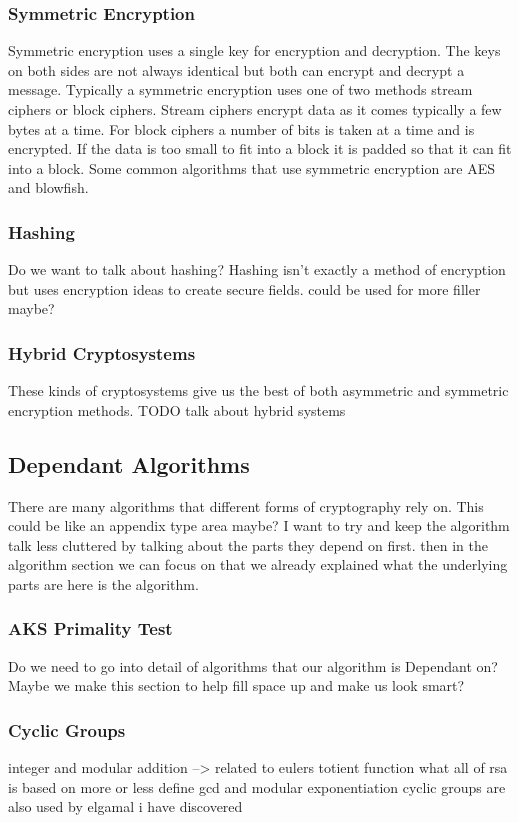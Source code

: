 \documentclass[conference]{IEEEtran}
\begin{document}
\subsubsection{Symmetric Encryption}
Symmetric encryption uses a single key for encryption and decryption. The keys on both sides are not always identical but both can encrypt and decrypt a message. Typically a symmetric encryption uses one of two methods stream ciphers or block ciphers. Stream ciphers encrypt data as it comes typically a few bytes at a time. For block ciphers a number of bits is taken at a time and is encrypted. If the data is too small to fit into a block it is padded so that it can fit into a block. Some common algorithms that use symmetric encryption are AES and blowfish.

\subsubsection{Hashing}
Do we want to talk about hashing? Hashing isn't exactly a method of encryption but uses encryption ideas to create secure fields. could be used for more filler maybe?

\subsubsection{Hybrid Cryptosystems}
These kinds of cryptosystems give us the best of both asymmetric and symmetric encryption methods. TODO talk about hybrid systems

\subsection{Dependant Algorithms}
There are many algorithms that different forms of cryptography rely on.
This could be like an appendix type area maybe?
I want to try and keep the algorithm talk less cluttered by talking about the parts they depend on first.
then in the algorithm section we can focus on that we already explained what the underlying parts are here is the algorithm.

\subsubsection{AKS Primality Test}
Do we need to go into detail of algorithms that our algorithm is Dependant on?
Maybe we make this section to help fill space up and make us look smart?

\subsubsection{Cyclic Groups}
integer and modular addition --> related to eulers totient function
what all of rsa is based on more or less
define gcd and modular exponentiation
\newline
cyclic groups are also used by elgamal i have discovered
\end{document}
